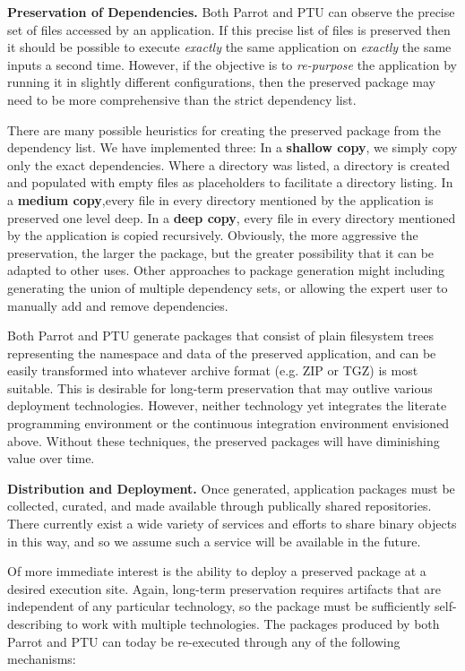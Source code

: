 {\bf Preservation of Dependencies.}  Both Parrot and PTU can observe the precise
set of files accessed by an application.  If this precise list of files is preserved
then it should be possible to execute
\emph{exactly} the same application on \emph{exactly} the same inputs a second
time.  However, if the objective is to \emph{re-purpose} the application by running it in slightly different configurations, then the preserved package may need to
be more comprehensive than the strict dependency list.

There are many possible heuristics for creating the preserved package
from the dependency list.  We have implemented three:
In a {\bf shallow copy}, we simply copy only
the exact dependencies.  Where a directory was listed, a directory is created and populated with empty files as placeholders to facilitate a directory listing.  In a {\bf medium copy},every file in every directory mentioned by the application is preserved one level deep.  In a {\bf deep copy}, every file in every directory mentioned by the application is copied recursively.  Obviously, the more aggressive the preservation, the larger the package, but the greater possibility that it can be adapted to other uses.  Other approaches to package generation might including generating the union
of multiple dependency sets, or allowing the expert user to manually add
and remove dependencies.

Both Parrot and PTU generate packages that consist of plain filesystem trees representing the namespace and data of the preserved application, and can be easily transformed into whatever archive format (e.g. ZIP or TGZ) is most suitable.  This is desirable for long-term preservation that may outlive various deployment technologies.
However, neither technology yet integrates the literate programming environment
or the continuous integration environment envisioned above.  Without these techniques, the preserved packages will have diminishing value over time.

{\bf Distribution and Deployment.}
Once generated, application packages must be collected, curated, and made
available through publically shared repositories.  There currently exist a
wide variety of services and efforts to share binary objects in this way,
and so we assume such a service will be available in the future.

Of more immediate interest is the ability to deploy a preserved
package at a desired execution site.  Again, long-term preservation
requires artifacts that are independent of any particular technology,
so the package must be sufficiently self-describing
to work with multiple technologies.  The packages produced by both Parrot and PTU
can today be re-executed through any of the following mechanisms:

